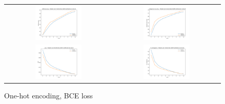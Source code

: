 \begin{appendices}
        \begin{figure}[H]
            \centering
            \begin{tabular}{cc}
                \includegraphics[width=0.45\textwidth]{figures/training_plots/ModelA-(1D)-OneHot-BCE-ADAM_10-04-2019_10-36-18_AON-accuracy.pdf} & \includegraphics[width=0.45\textwidth]{figures/training_plots/ModelA-(1D)-OneHot-BCE-ADAM_10-04-2019_10-36-18_categorical-accuracy.pdf} \\
                \includegraphics[width=0.45\textwidth]{figures/training_plots/ModelA-(1D)-OneHot-BCE-ADAM_10-04-2019_10-36-18_loss.pdf} & \includegraphics[width=0.45\textwidth]{figures/training_plots/ModelA-(1D)-OneHot-BCE-ADAM_10-04-2019_10-36-18_KL-divergence.pdf}
            \end{tabular}
            \caption*{One-hot encoding, BCE loss}
        \end{figure}
        

\end{appendices}
